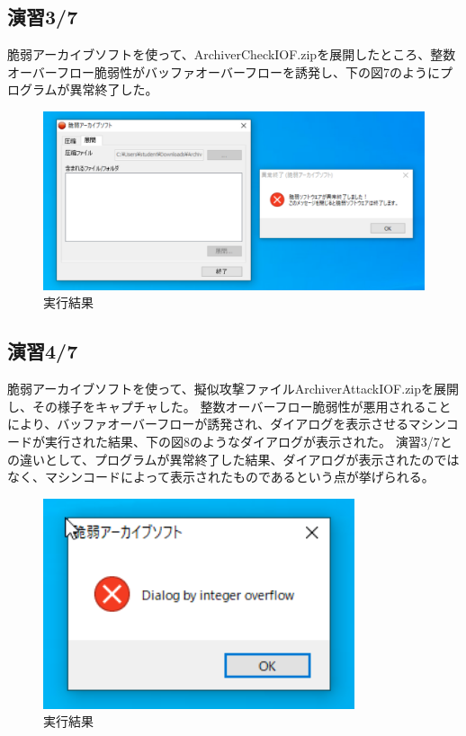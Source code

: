 \documentclass[dvipdfmx,autodetect-engine,titlepage]{jsarticle}
\begin{document}
\subsection{演習3/7}
脆弱アーカイブソフトを使って、ArchiverCheckIOF.zipを展開したところ、整数オーバーフロー脆弱性がバッファオーバーフローを誘発し、下の図7のようにプログラムが異常終了した。\\
\begin{figure}[H]
  \centering
  \includegraphics[scale=0.6]{fg6.png}
  \caption{実行結果}\label{fig:図6}
\end{figure}

\subsection{演習4/7}
脆弱アーカイブソフトを使って、擬似攻撃ファイルArchiverAttackIOF.zipを展開し、その様子をキャプチャした。
整数オーバーフロー脆弱性が悪用されることにより、バッファオーバーフローが誘発され、ダイアログを表示させるマシンコードが実行された結果、下の図8のようなダイアログが表示された。
演習3/7との違いとして、プログラムが異常終了した結果、ダイアログが表示されたのではなく、マシンコードによって表示されたものであるという点が挙げられる。\\

\begin{figure}[H]
  \centering
  \includegraphics[scale=0.9]{fg7.png}
  \caption{実行結果}\label{fig:図7}
\end{figure}
\end{document}
